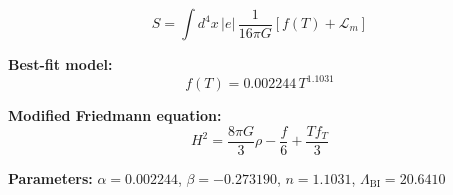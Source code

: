 
\begin{equation}
  S = \int d^4x \, |e| \, \frac{1}{16\pi G} \left[ f(T) + \mathcal{L}_m \right]
\end{equation}

\textbf{Best-fit model:}
\begin{equation}
  f(T) = 0.002244 \, T^{1.1031}
\end{equation}

\textbf{Modified Friedmann equation:}
\begin{equation}
  H^2 = \frac{8\pi G}{3} \rho - \frac{f}{6} + \frac{T f_T}{3}
\end{equation}

\textbf{Parameters:}
$\alpha = 0.002244$, \quad
$\beta = -0.273190$, \quad
$n = 1.1031$, \quad
$\Lambda_{\text{BI}} = 20.6410$